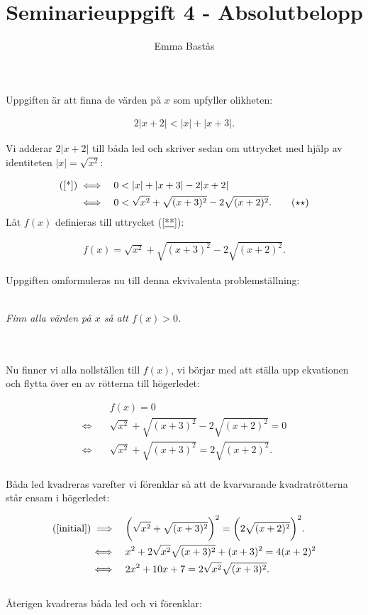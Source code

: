 \documentclass{article}
\title{Seminarieuppgift 4 - Absolutbelopp}
\author{Emma Bastås}
\begin{document}
\maketitle

\noindent Uppgiften är att finna de värden på $x$ som upfyller olikheten:

\begin{gather*}
  2|x+2| < |x| + |x+3|\text{.} \label{*}\tag{$\star$}
\end{gather*}

\noindent Vi adderar $2|x+2|$ till båda led och skriver sedan om uttrycket med hjälp av identiteten $|x| = \sqrt{x^{2}}$:

\begin{align*}
  \text{(\ref{*})} \iff& \quad 0 < |x| + |x + 3| - 2|x+2| \\
  \iff& \quad 0 < \sqrt{x^{2}} + \sqrt{(x + 3)^{2}} - 2 \sqrt{(x + 2)^{2}}\text{.} \label{**}\tag{$\star\star$}
\end{align*}
\noindent Låt $f(x)$ definieras till uttrycket (\ref{**}):

\begin{gather*}
  f(x) =  \sqrt{x^{2}} + \sqrt{(x + 3)^{2}} - 2 \sqrt{(x + 2)^{2}}\text{.}
\end{gather*}

\noindent Uppgiften omformuleras nu till denna ekvivalenta problemställning:
\\
\\
\centerline{\emph{Finn alla värden på $x$ så att $f(x) > 0$.}}
\\
\\
Nu finner vi alla nollställen till $f(x)$, vi börjar med att ställa upp ekvationen och flytta över en av rötterna till högerledet:

\begin{align}
  \quad & f(x) = 0 \nonumber\\
  \iff \quad &\sqrt{x^{2}} + \sqrt{(x + 3)^{2}} - 2 \sqrt{(x + 2)^{2}} = 0 \nonumber\\
  \iff \quad &\sqrt{x^{2}} + \sqrt{(x + 3)^{2}} = 2 \sqrt{(x + 2)^{2}}\text{.} \label{initial}
\end{align}
\\
Båda led kvadreras varefter vi förenklar så att de kvarvarande kvadratrötterna står ensam i högerledet:

\begin{align}
  \text{(\ref{initial})} \implies \quad & \biggl(\sqrt{x^{2}} + \sqrt{(x + 3)^{2}}\biggr)^{2} = \biggl(2 \sqrt{(x + 2)^{2}}\biggr)^{2}\text{.} \nonumber\\
  \iff \quad & x^{2} + 2\sqrt{x^{2}}\sqrt{(x+3)^{2}} + (x + 3)^{2} = 4(x+2)^{2} \nonumber\\
  \iff \quad & 2x^{2} + 10x + 7 = 2\sqrt{x^{2}}\sqrt{(x+3)^{2}}\text{.} \label{squared}
\end{align}
\\
Återigen kvadreras båda led och vi förenklar:
\end{document}
